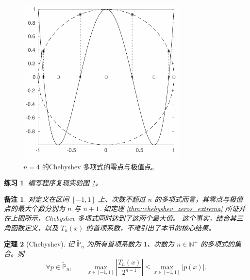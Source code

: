 \documentclass[a4paper]{ctexart}
\newtheorem{theorem}{定理}
\newtheorem{remark}{备注}
\newtheorem{exercise}[theorem]{练习}
\numberwithin{theorem}{section}
\numberwithin{equation}{section}
\numberwithin{figure}{section}
\numberwithin{remark}{section}
\begin{document}
\begin{figure}
    \centering
    \includegraphics[width=0.75\textwidth]{images/chebyshev.png}
    \caption{$n = 4$ 的Chebyshev 多项式的零点与极值点。}
    \label{fig::chebyshev_zeros_extrema}
\end{figure}

\begin{exercise}
编写程序复现实验图 \ref{fig::chebyshev_zeros_extrema}。
\end{exercise}

\begin{remark}
对定义在区间 $[-1,1]$ 上、次数不超过 $n$ 的多项式而言，其零点与极值点的最大个数分别为 $n$ 与 $n+1$. 
如定理 \ref{thm::chebyshev_zeros_extrema} 所证并在上图所示，Chebyshev 多项式同时达到了这两个最大值。
这个事实，结合其三角函数定义，以及 $T_n(x)$ 的首项系数，不难引出了本节的核心结果。
\end{remark}

\begin{theorem}[Chebyshev]
记 $\widetilde{\mathbb{P}}_n$ 为所有首项系数为 $1$、次数为 $n\in\mathbb{N}^+$ 的多项式的集合。则
\begin{equation}
    \label{eq::chebyshev_minimax}
\forall p\in\widetilde{\mathbb{P}}_n,\qquad
\max_{x\in[-1,1]}\left|\frac{T_n(x)}{2^{n-1}}\right|
\le \max_{x\in[-1,1]} |p(x)|.
\end{equation}
\end{theorem}
\end{document}
